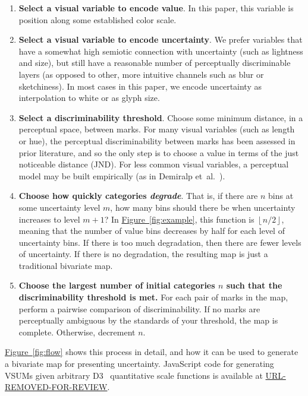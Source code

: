 \documentclass{vgtc}                          %
\newcommand{\figref}[1]{\hyperref[#1]{Figure~\ref*{#1}}}
\newcommand{\ea}{{et~al.}\xspace}
\begin{document}
\begin{enumerate}
	\item \textbf{Select a visual variable to encode value}. In this paper, this variable is position along some established color scale.
	\item \textbf{Select a visual variable to encode uncertainty}. We prefer variables that have a somewhat high semiotic connection with uncertainty (such as lightness and size), but still have a reasonable number of perceptually discriminable layers (as opposed to other, more intuitive channels such as blur or sketchiness). In most cases in this paper, we encode uncertainty as interpolation to white or as glyph size.
	\item \textbf{Select a discriminability threshold}. Choose some minimum distance, in a perceptual space, between marks. For many visual variables (such as length or hue), the perceptual discriminability between marks has been assessed in prior literature, and so the only step is to choose a value in terms of the just noticeable distance (JND). For less common visual variables, a perceptual model may be built empirically (as in Demiralp \ea~\cite{demiralp2014learning}).
	\item \textbf{Choose how quickly categories \emph{degrade}}. That is, if there are $n$ bins at some uncertainty level $m$, how many bins should there be when uncertainty increases to level $m+1$? In \figref{fig:example}, this function is $\left \lfloor n / 2 \right \rfloor$, meaning that the number of value bins decreases by half for each level of uncertainty bins. If there is too much degradation, then there are fewer levels of uncertainty. If there is no degradation, the resulting map is just a traditional bivariate map.
	\item \textbf{Choose the largest number of initial categories $n$ such that the discriminability threshold is met.} For each pair of marks in the map, perform a pairwise comparison of discriminability. If no marks are perceptually ambiguous by the standards of your threshold, the map is complete. Otherwise, decrement $n$.
\end{enumerate}

\figref{fig:flow} shows this process in detail, and how it can be used to generate a bivariate map for presenting uncertainty. JavaScript code for generating VSUMs given arbitrary D3~\cite{bostock2011d3} quantitative scale functions is available at \url{URL-REMOVED-FOR-REVIEW}.
\end{document}
